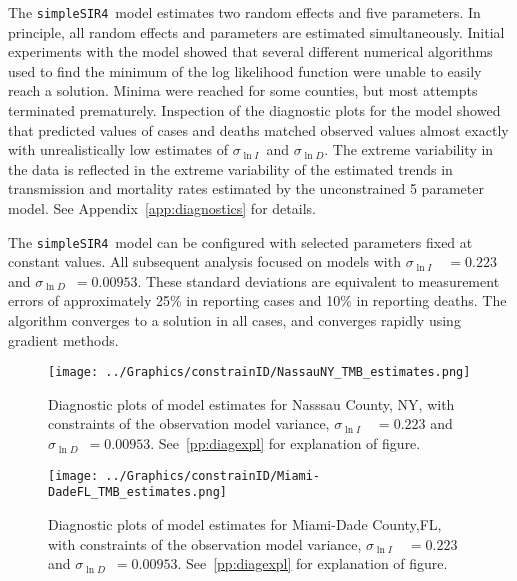 \documentclass[12pt,letterpaper]{article}
\newcommand\SSm{{\tt simpleSIR4}}
\newcommand\slI{$\sigma_{\ln I}$\ }
\newcommand\slD{$\sigma_{\ln D}$}
\begin{document}
The \SSm\  model estimates two random effects and five parameters.
In principle, all random effects and parameters are estimated
simultaneously.
Initial experiments with the model showed that several different
numerical algorithms used to find the minimum of the log likelihood
function were unable to easily reach a solution. Minima were reached
for some counties, but most attempts terminated prematurely. 
Inspection of the diagnostic plots for the model showed that predicted
values of cases and deaths matched observed values almost exactly
with unrealistically low estimates of \slI and \slD.
The extreme variability in the data is reflected in the extreme
variability of the estimated trends in transmission and mortality
rates estimated by the unconstrained 5 parameter model.
See Appendix~\ref{app:diagnostics} for details.

The \SSm\ model can be configured with selected parameters fixed at
constant values. 
All subsequent analysis focused on models with 
\slI~$ = 0.223$ and \slD~$= 0.00953$. 
These standard deviations are equivalent to measurement errors of
approximately 25\% in reporting cases and 10\% in reporting deaths.
The algorithm converges to a solution in all cases, and converges
rapidly using gradient methods.

\begin{figure}
\begin{center}
\texttt{[image: ../Graphics/constrainID/NassauNY\_TMB\_estimates.png]}
\end{center}
\caption{\label{fig:estsNaNYc}
Diagnostic plots of model estimates for Nasssau County, NY, 
with constraints of the observation model variance, 
\slI~$ = 0.223$ and \slD~$= 0.00953$. 
See~\ref{pp:diagexpl} for explanation of figure.
}
\end{figure}

\begin{figure}
\begin{center}
\texttt{[image: ../Graphics/constrainID/Miami-DadeFL\_TMB\_estimates.png]}
\end{center}
\caption{\label{fig:estsMDFLc}
Diagnostic plots of model estimates for Miami-Dade County,FL,
with constraints of the observation model variance, 
\slI~$ = 0.223$ and \slD~$= 0.00953$. 
See~\ref{pp:diagexpl} for explanation of figure.
}
\end{figure}
\end{document}
